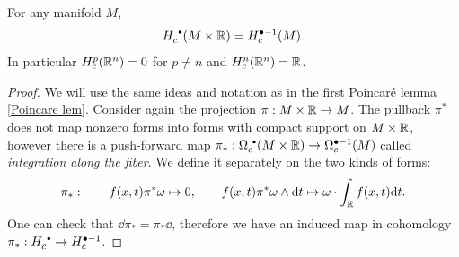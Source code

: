 \begin{thm}
    For any manifold $M$, 
    \[H_c^{\smbullet }(M\times \bbR)=H_c^{\bullet-1}(M).\] 
    In particular $H_c^p(\mathbb{R}^n)=0$ for $p\neq n$ and $H_c^n(\mathbb{R}^n)=\mathbb{R}$.
\end{thm}
\begin{proof}
    We will use the same ideas and notation as in the first Poincar\'e lemma \ref{Poincare lem}. Consider again the projection $\pi:M\times \mathbb{R}\to M$. The pullback $\pi^\ast$ does not map nonzero forms into forms with compact support on $M\times\mathbb{R}$, however there is a push-forward map $\pi_\ast:\Omega_c^{\smbullet }(M\times\bbR)\to \Omega_c^{\bullet-1}(M)$ called \emph{integration along the fiber}. We define it separately on the two kinds of forms:
    \begin{equation}
        \pi_\ast: \quad\quad f(x,t)\pi^\ast\omega\mapsto  0,\quad\quad f(x,t)\pi^\ast \omega \wedge {\mathrm{d}} t\mapsto  \omega\cdot\int_{\mathbb{R}} f(x,t){\mathrm{d}} t. 
    \end{equation}
    One can check that $\dd\pi_\ast=\pi_\ast \dd$, therefore we have an induced map in cohomology $\pi_\ast:H_c^{\smbullet }\to H_c^{\bullet-1}$.
    

\end{proof}
